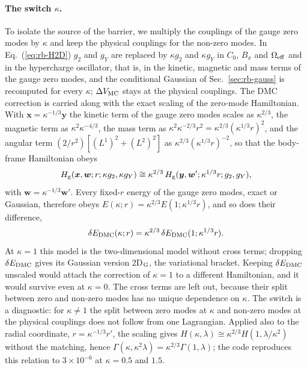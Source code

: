 \paragraph{The switch $\kappa$.}
To isolate the source of the barrier, we multiply the couplings of the gauge zero modes by $\kappa$ and keep the physical couplings for the non-zero modes.
In Eq.~(\ref{eq:rb-H2D}) $g_2$ and $g_Y$ are replaced by $\kappa g_2$ and $\kappa g_Y$ in $C_0$, $B_x$ and $\Omega_{\rm eff}$ and in the hypercharge oscillator, that is, in the kinetic, magnetic and mass terms of the gauge zero modes, and the conditional Gaussian of Sec.~\ref{sec:rb-gauss} is recomputed for every $\kappa$; $\Delta V_{\rm MC}$ stays at the physical couplings.
The DMC correction is carried along with the exact scaling of the zero-mode Hamiltonian.
With $\bm x=\kappa^{-1/3}\bm y$ the kinetic term of the gauge zero modes scales as $\kappa^{2/3}$, the magnetic term as $\kappa^2\kappa^{-4/3}$, the mass term as $\kappa^2\kappa^{-2/3}r^2=\kappa^{2/3}(\kappa^{1/3}r)^2$, and the angular term $(2/r^2)[(L^1)^2+(L^2)^2]$ as $\kappa^{2/3}(\kappa^{1/3}r)^{-2}$, so that the body-frame Hamiltonian obeys
\begin{equation}
H_{\rm g}(\bm x,\bm w;r;\kappa g_2,\kappa g_Y)\cong\kappa^{2/3}\,H_{\rm g}(\bm y,\bm w';\kappa^{1/3}r;g_2,g_Y),
\label{eq:v11-kappa-scaling}
\end{equation}
with $\bm w=\kappa^{-1/3}\bm w'$.
Every fixed-$r$ energy of the gauge zero modes, exact or Gaussian, therefore obeys $E(\kappa;r)=\kappa^{2/3}E(1;\kappa^{1/3}r)$, and so does their difference,
\begin{equation}
\delta E_{\rm DMC}(\kappa;r)=\kappa^{2/3}\,\delta E_{\rm DMC}(1;\kappa^{1/3}r).
\label{eq:v11-dmc-kappa}
\end{equation}
At $\kappa=1$ this model is the two-dimensional model without cross terms; dropping $\delta E_{\rm DMC}$ gives its Gaussian version 2D$_{\rm G}$, the variational bracket.
Keeping $\delta E_{\rm DMC}$ unscaled would attach the correction of $\kappa=1$ to a different Hamiltonian, and it would survive even at $\kappa=0$.
The cross terms are left out, because their split between zero and non-zero modes has no unique dependence on $\kappa$.
The switch is a diagnostic: for $\kappa\neq1$ the split between zero modes at $\kappa$ and non-zero modes at the physical couplings does not follow from one Lagrangian.
Applied also to the radial coordinate, $r=\kappa^{-1/3}r'$, the scaling gives $H(\kappa,\lambda)\cong\kappa^{2/3}H(1,\lambda/\kappa^2)$ without the matching, hence $\Gamma(\kappa,\kappa^2\lambda)=\kappa^{2/3}\Gamma(1,\lambda)$; the code reproduces this relation to $3\times10^{-6}$ at $\kappa=0.5$ and $1.5$. %

